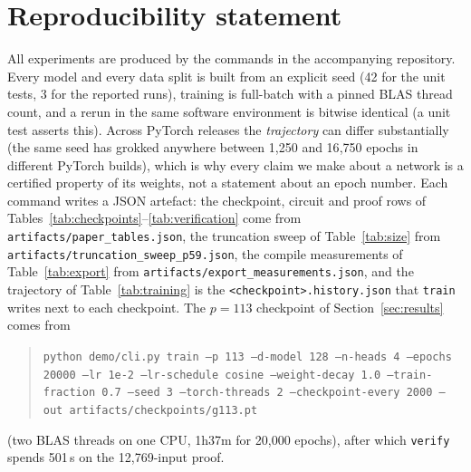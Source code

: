 \documentclass[11pt]{article}
\newcommand{\code}[1]{\texttt{#1}}
\begin{document}
\section*{Reproducibility statement}
All experiments are produced by the commands in the accompanying repository.
Every model and every data split is built from an explicit seed (42 for the unit
tests, 3 for the reported runs), training is full-batch with a pinned BLAS thread
count, and a rerun in the same software environment is bitwise identical (a unit
test asserts this). Across PyTorch releases the \emph{trajectory} can differ
substantially (the same seed has grokked anywhere between 1{,}250 and 16{,}750
epochs in different PyTorch builds), which is why every claim we make about a
network is a certified
property of its weights, not a statement about an epoch number. Each command
writes a JSON artefact: the checkpoint, circuit and proof rows of
Tables~\ref{tab:checkpoints}--\ref{tab:verification} come from
\code{artifacts/paper\_tables.json}, the truncation sweep of
Table~\ref{tab:size} from \code{artifacts/truncation\_sweep\_p59.json}, the
compile measurements of Table~\ref{tab:export} from
\code{artifacts/export\_measurements.json}, and the trajectory of
Table~\ref{tab:training} is the \code{<checkpoint>.history.json} that
\code{train} writes next to each checkpoint.
The $p=113$ checkpoint of Section~\ref{sec:results} comes from

\begin{quote}\small
\code{python demo/cli.py train --p 113 --d-model 128 --n-heads 4 --epochs 20000
--lr 1e-2 --lr-schedule cosine --weight-decay 1.0 --train-fraction 0.7 --seed 3
--torch-threads 2 --checkpoint-every 2000 --out artifacts/checkpoints/g113.pt}
\end{quote}

\noindent (two BLAS threads on one CPU, 1h37m for 20{,}000 epochs), after which
\code{verify}
spends 501\,s on the 12{,}769-input proof.
\end{document}
